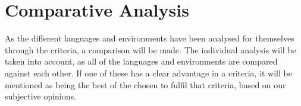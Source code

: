 \chapter{Comparative Analysis}
\label{chap:comparative_analysis}

As the different languages and environments have been analysed for themselves through the criteria, a comparison will be made. The individual analysis will be taken into account, as all of the languages and environments are compared against each other. If one of these has a clear advantage in a criteria, it will be mentioned as being the best of the chosen to fulfil that criteria, based on our subjective opinions.










